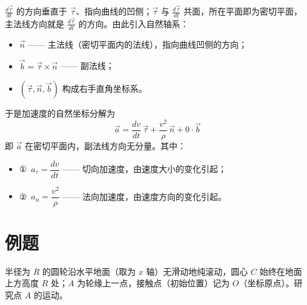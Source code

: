 
\begin{center}
\end{center}

$\frac{d\vec{\tau}}{dt}$ 的方向垂直于 $\vec{\tau}$、指向曲线的凹侧；$\vec{\tau}$ 与 $\frac{d\vec{\tau}}{dt}$ 共面，所在平面即为密切平面，主法线方向就是 $\frac{d\vec{\tau}}{dt}$ 的方向。由此引入自然轴系：
\begin{itemize}
  \item $\vec{n}$ —— 主法线（密切平面内的法线），指向曲线凹侧的方向；
  \item $\vec{b} = \vec{\tau}\times\vec{n}$ —— 副法线；
  \item $(\vec{\tau},\vec{n},\vec{b})$ 构成右手直角坐标系。
\end{itemize}
于是加速度的自然坐标分解为
\begin{equation}
  \vec{a} = \frac{dv}{dt}\,\vec{\tau} + \frac{v^2}{\rho}\,\vec{n} + 0\cdot\vec{b}
  \label{eq:6-a-natural}
\end{equation}
即 $\vec{a}$ 在密切平面内，副法线方向无分量。其中：
\begin{itemize}
  \item ①\ $a_\tau = \dfrac{dv}{dt}$ —— 切向加速度，由速度大小的变化引起；
  \item ②\ $a_n = \dfrac{v^2}{\rho}$ —— 法向加速度，由速度方向的变化引起。
\end{itemize}

\section{例题}

\begin{longexample}[纯滚动轮缘点的运动——摆线]
半径为 $R$ 的圆轮沿水平地面（取为 $x$ 轴）无滑动地纯滚动，圆心 $C$ 始终在地面上方高度 $R$ 处；$A$ 为轮缘上一点，接触点（初始位置）记为 $O$（坐标原点）。研究点 $A$ 的运动。
\end{longexample}

